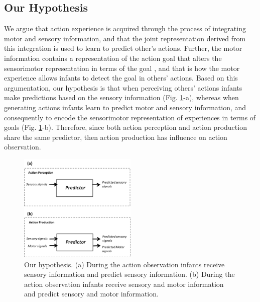 \documentclass[conference]{IEEEtran}
\begin{document}
\subsection{Our Hypothesis}
We argue that action experience is acquired through the process of integrating motor and sensory information, and that the joint representation derived from this integration is used to learn to predict other's actions. Further, the motor information contains a representation of the action goal that alters the sensorimotor representation in terms of the goal \cite{rizzolatti2014cortical}, and that is how the motor experience allows infants to detect the goal in others' actions. Based on this argumentation, our hypothesis is that when perceiving others' actions infants make predictions based on the sensory information (Fig. \ref{Hypothesis}-a), whereas when generating actions infants learn to predict motor and sensory information, and consequently to encode the sensorimotor representation of experiences in terms of goals (Fig. \ref{Hypothesis}-b). Therefore, since both action perception and action production share the same predictor, then action production has influence on action observation.

\begin{figure}[!t]
\centering
\includegraphics[width=0.5\textwidth,natwidth=700,natheight=450]{Hypothesis.png}
\caption{Our hypothesis. (a) During the action observation infants receive sensory information and predict sensory information. (b) During the action observation infants receive sensory and motor information and predict sensory and motor information.}
\label{Hypothesis}
\end{figure}
\end{document}
